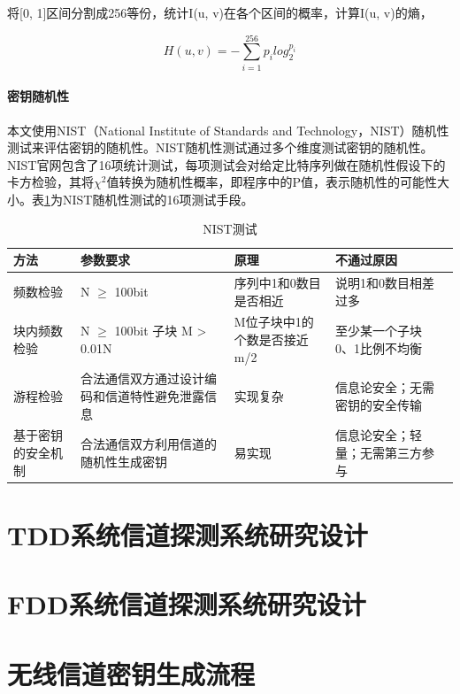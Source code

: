 \documentclass[master]{seuthesis} %
\begin{document}
\begin{Main}
将[0, 1]区间分割成256等份，统计I(u, v)在各个区间的概率，计算I(u, v)的熵，

\begin{equation}
  H(u, v) = -\sum_{i=1}^{256} p_i log_2^{p_i}
\end{equation}

\subsubsection{密钥随机性}

本文使用NIST（National Institute of Standards and Technology，NIST）随机性测试来评估密钥的随机性\cite{bassham2010statistical}。NIST随机性测试通过多个维度测试密钥的随机性\cite{zaman2012review}。NIST官网包含了16项统计测试，每项测试会对给定比特序列做在随机性假设下的卡方检验，其将$\chi^2$值转换为随机性概率，即程序中的P值，表示随机性的可能性大小。表\ref{NIST-schemes}为NIST随机性测试的16项测试手段。


\begin{table}[]
    \begin{tabular}{|l|l|l|l|l|}
    \hline
    方法 & 参数要求 & 原理 & 不通过原因 \\ \hline
    频数检验 & N $\geq$ 100bit & 序列中1和0数目是否相近 & 说明1和0数目相差过多  \\ \hline
    块内频数检验 & N $\geq$ 100bit 子块 M > 0.01N & M位子块中1的个数是否接近m/2 & 至少某一个子块0、1比例不均衡 \\ \hline
    游程检验 & 合法通信双方通过设计编码和信道特性避免泄露信息 & 实现复杂 & 信息论安全；无需密钥的安全传输  \\ \hline
    基于密钥的安全机制 & 合法通信双方利用信道的随机性生成密钥 & 易实现 & 信息论安全；轻量；无需第三方参与 \\ \hline
    \end{tabular}
    \caption{NIST测试
    \label{NIST-schemes}}
\end{table}

\chapter{TDD系统信道探测系统研究设计}
\chapter{FDD系统信道探测系统研究设计}
\chapter{无线信道密钥生成流程}


\end{Main}
\end{document}
